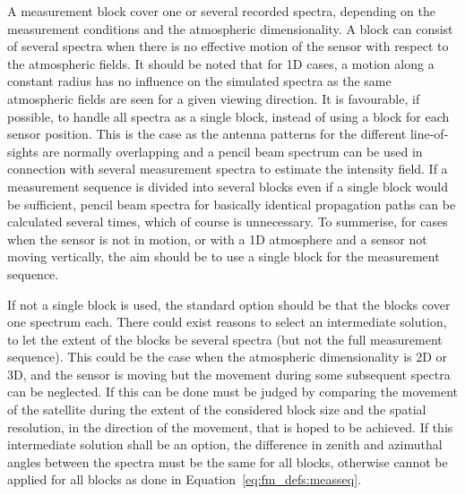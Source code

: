 A measurement block cover one or several recorded spectra, depending
on the measurement conditions and the atmospheric dimensionality. A
block can consist of several spectra when there is no effective
motion of the sensor with respect to the atmospheric fields. It should
be noted that for 1D cases, a motion along a constant radius has no
influence on the simulated spectra as the same atmospheric fields are
seen for a given viewing direction. It is favourable, if possible, to
handle all spectra as a single block, instead of using a block for
each sensor position. This is the case as the antenna patterns for the
different line-of-sights are normally overlapping and a pencil beam
spectrum can be used in connection with several measurement spectra to
estimate the intensity field. If a measurement sequence is divided
into several blocks even if a single block would be sufficient, pencil
beam spectra for basically identical propagation paths can be
calculated several times, which of course is unnecessary. To
summerise, for cases when the sensor is not in motion, or with a 1D
atmosphere and a sensor not moving vertically, the aim should be to
use a single block for the measurement sequence.

If not a single block is used, the standard option should be that the
blocks cover one spectrum each. There could exist reasons to select an
intermediate solution, to let the extent of the blocks be several
spectra (but not the full measurement sequence). This could be the
case when the atmospheric dimensionality is 2D or 3D, and the sensor
is moving but the movement during some subsequent spectra can be
neglected. If this can be done must be judged by comparing the
movement of the satellite during the extent of the considered block
size and the spatial resolution, in the direction of the movement, that
is hoped to be achieved. If this intermediate solution shall be an
option, the difference in zenith and azimuthal angles between the
spectra must be the same for all blocks, otherwise  cannot
be applied for all blocks as done in Equation~\ref{eq:fm_defs:measseq}.


